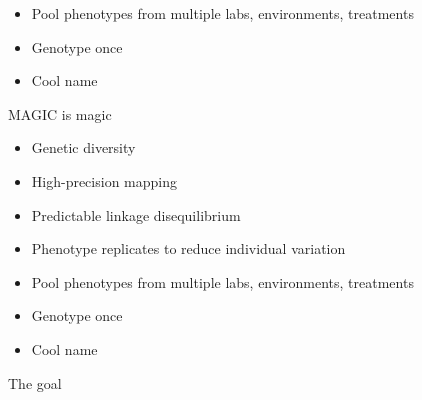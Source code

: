 \documentclass[12pt]{article}
\newcommand{\headsize}{\fontsize{35}{35} \selectfont}
\newcommand{\smallsize}{\fontsize{25}{30} \selectfont}
\begin{document}
{\begin{minipage}{10in}
\begin{itemize}
\item Pool phenotypes from multiple labs, environments, treatments

\item Genotype once

\color{mybgcolor}
\item Cool name

\end{itemize}
\end{minipage}



\newpage

\addtocounter{page}{-1}

\headsize \color{myyellow}
\hfill \begin{minipage}{5.75in}
\centering
MAGIC is magic
\end{minipage}

\vspace{25mm}

\color{mywhite}
\smallsize

\hfill \begin{minipage}{10in}
\begin{itemize}
\itemsep24pt
\item Genetic diversity

\item High-precision mapping

\item Predictable linkage disequilibrium

\item Phenotype replicates to reduce individual variation

\item Pool phenotypes from multiple labs, environments, treatments

\item Genotype once

\color{myblue}
\item Cool name

\end{itemize}
\end{minipage}

\newpage


\headsize \color{myyellow}
\hfill \begin{minipage}{5.75in}
\centering
The goal
\end{minipage}

\vspace{25mm}

\color{mywhite}
\smallsize

}
\end{document}
